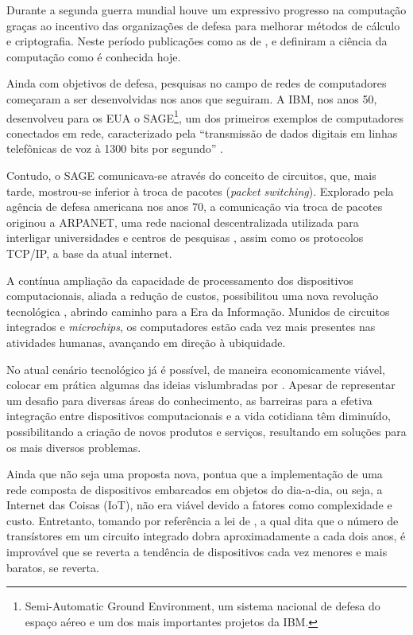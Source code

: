 \documentclass[twoside,english,brazilian]{UNISINOSmonografia}
\begin{document}
	Durante a segunda guerra mundial houve um expressivo progresso na 
	computação graças ao incentivo das organizações de defesa para melhorar 
	métodos de cálculo e criptografia. Neste período publicações como as de 
	,  e 
	 definiram a ciência da computação como é 
	conhecida hoje.

	Ainda com objetivos de defesa, pesquisas no campo de redes de computadores 
	começaram a ser desenvolvidas nos anos que seguiram. A IBM, nos anos 50,
	desenvolveu para os EUA o SAGE\footnote{Semi-Automatic Ground Environment, 
	um sistema nacional de defesa do espaço aéreo e um dos mais importantes 
	projetos da IBM. 
	}, 
	um dos primeiros exemplos de computadores conectados em rede, 
	caracterizado pela ``transmissão de dados digitais em linhas telefônicas 
	de voz à 1300 bits por segundo'' \cite{IBMSAGE1983}.

	Contudo, o SAGE comunicava-se através do conceito de circuitos, que, mais 
	tarde, mostrou-se inferior à troca de pacotes (\textit{packet switching}). 
	Explorado pela agência de defesa americana nos anos 70, a comunicação via 
	troca de pacotes originou a ARPANET, uma rede nacional descentralizada 
	utilizada para interligar universidades e centros de pesquisas 
	\cite{ARPANET1964}, assim como os protocolos TCP/IP, a base da atual 
	internet.

	A contínua ampliação da capacidade de processamento dos dispositivos 
	computacionais, aliada a redução de custos, possibilitou uma nova 
	revolução tecnológica \cite{Atzori2010b}, abrindo caminho para a Era da 
	Informação.
	Munidos de circuitos integrados e \textit{microchips}, os computadores 
	estão cada vez mais presentes nas atividades humanas, avançando em direção 
	à ubiquidade.
	
	No atual cenário tecnológico já é possível, de maneira economicamente 
	viável, colocar em prática algumas das ideias vislumbradas por 
	. 
	Apesar de representar um desafio para diversas áreas do conhecimento, as 
	barreiras para a efetiva integração entre dispositivos computacionais e a 
	vida cotidiana têm diminuído, possibilitando a criação de novos produtos e 
	serviços, resultando em soluções para os mais diversos problemas.
	
	Ainda que não seja uma proposta nova,  pontua que a 
	implementação de uma rede composta de dispositivos embarcados em objetos 
	do dia-a-dia, ou seja, a Internet das Coisas (IoT), não era viável devido 
	a fatores como complexidade e custo. 
	Entretanto, tomando por referência a lei de , a qual 
	dita que o número de transístores em um circuito integrado dobra 
	aproximadamente a cada dois anos, é improvável que se reverta a tendência 
	de dispositivos cada vez menores e mais baratos, se reverta.
	
\end{document}
